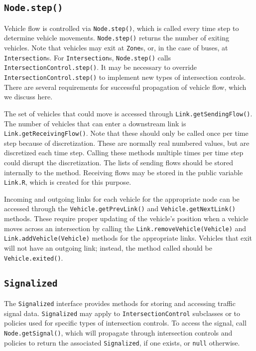 \subsection{\texttt{Node.step()}}

Vehicle flow is controlled via \texttt{Node.step()}, which is called every time step to determine vehicle movements. \texttt{Node.step()} returns the number of exiting vehicles. Note that vehicles may exit at \texttt{Zone}s, or, in the case of buses, at \texttt{Intersection}s. For \texttt{Intersection}s, \texttt{Node.step()} calls \texttt{IntersectionControl.step()}. It may be necessary to override \texttt{IntersectionControl.step()} to implement new types of intersection controls. There are several requirements for successful propagation of vehicle flow, which we discuss here.

The set of vehicles that could move is accessed through \texttt{Link.getSendingFlow()}. The number of vehicles that can enter a downstream link is \texttt{Link.getReceivingFlow()}. Note that these should only be called once per time step because of discretization. These are normally real numbered values, but are discretized each time step. Calling these methods multiple times per time step could disrupt the discretization. The lists of sending flows should be stored internally to the method. Receiving flows may be stored in the public variable \texttt{Link.R}, which is created for this purpose.

Incoming and outgoing links for each vehicle for the appropriate node can be accessed through the \texttt{Vehicle.getPrevLink()} and \texttt{Vehicle.getNextLink()} methods. These require proper updating of the vehicle's position when a vehicle moves across an intersection by calling the \texttt{Link.removeVehicle(Vehicle)} and \texttt{Link.addVehicle(Vehicle)} methods for the appropriate links. Vehicles that exit will not have an outgoing link; instead, the method called should be \texttt{Vehicle.exited()}.


\subsection{\texttt{Signalized}}

The \texttt{Signalized} interface provides methods for storing and accessing traffic signal data. \texttt{Signalized} may apply to \texttt{IntersectionControl} subclasses or to policies used for specific types of intersection controls. To access the signal, call \texttt{Node.getSignal()}, which will propagate through intersection controls and policies to return the associated \texttt{Signalized}, if one exists, or \texttt{null} otherwise.


